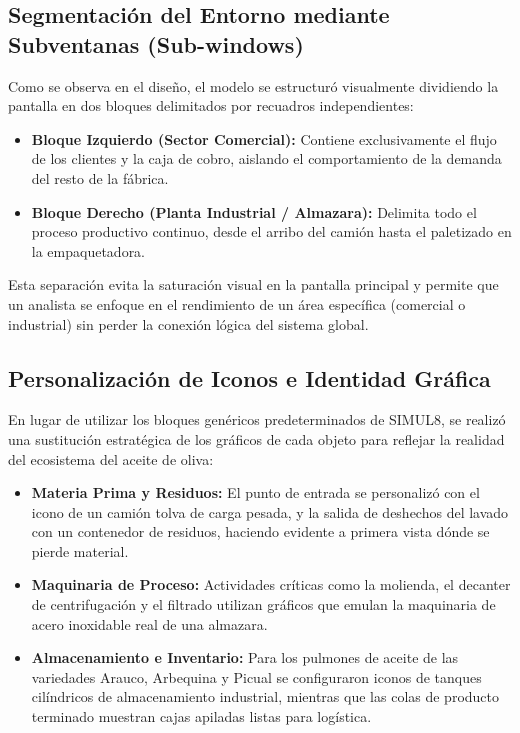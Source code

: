 \documentclass[runningheads]{llncs}
\begin{document}
\subsection{Segmentación del Entorno mediante Subventanas (Sub-windows)}
Como se observa en el diseño, el modelo se estructuró visualmente dividiendo la pantalla en dos bloques delimitados por recuadros independientes:
\begin{itemize}
    \item \textbf{Bloque Izquierdo (Sector Comercial):} Contiene exclusivamente el flujo de los clientes y la caja de cobro, aislando el comportamiento de la demanda del resto de la fábrica.
    \item \textbf{Bloque Derecho (Planta Industrial / Almazara):} Delimita todo el proceso productivo continuo, desde el arribo del camión hasta el paletizado en la empaquetadora.
\end{itemize}
Esta separación evita la saturación visual en la pantalla principal y permite que un analista se enfoque en el rendimiento de un área específica (comercial o industrial) sin perder la conexión lógica del sistema global.

\subsection{Personalización de Iconos e Identidad Gráfica}
En lugar de utilizar los bloques genéricos predeterminados de SIMUL8, se realizó una sustitución estratégica de los gráficos de cada objeto para reflejar la realidad del ecosistema del aceite de oliva:
\begin{itemize}
    \item \textbf{Materia Prima y Residuos:} El punto de entrada se personalizó con el icono de un camión tolva de carga pesada, y la salida de deshechos del lavado con un contenedor de residuos, haciendo evidente a primera vista dónde se pierde material.
    \item \textbf{Maquinaria de Proceso:} Actividades críticas como la molienda, el decanter de centrifugación y el filtrado utilizan gráficos que emulan la maquinaria de acero inoxidable real de una almazara.
    \item \textbf{Almacenamiento e Inventario:} Para los pulmones de aceite de las variedades Arauco, Arbequina y Picual se configuraron iconos de tanques cilíndricos de almacenamiento industrial, mientras que las colas de producto terminado muestran cajas apiladas listas para logística.
\end{itemize}
\end{document}
